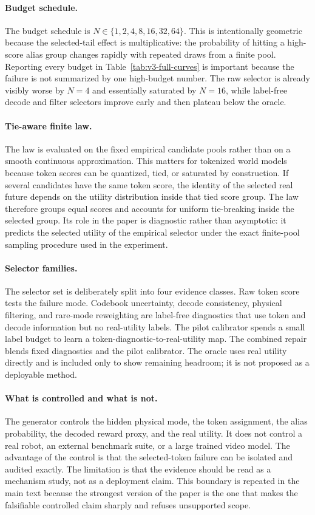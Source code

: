 \paragraph{Budget schedule.}
The budget schedule is $N\in\{1,2,4,8,16,32,64\}$. This is intentionally geometric because the selected-tail effect is multiplicative: the probability of hitting a high-score alias group changes rapidly with repeated draws from a finite pool. Reporting every budget in Table~\ref{tab:v3-full-curves} is important because the failure is not summarized by one high-budget number. The raw selector is already visibly worse by $N=4$ and essentially saturated by $N=16$, while label-free decode and filter selectors improve early and then plateau below the oracle.

\paragraph{Tie-aware finite law.}
The law is evaluated on the fixed empirical candidate pools rather than on a smooth continuous approximation. This matters for tokenized world models because token scores can be quantized, tied, or saturated by construction. If several candidates have the same token score, the identity of the selected real future depends on the utility distribution inside that tied score group. The law therefore groups equal scores and accounts for uniform tie-breaking inside the selected group. Its role in the paper is diagnostic rather than asymptotic: it predicts the selected utility of the empirical selector under the exact finite-pool sampling procedure used in the experiment.

\paragraph{Selector families.}
The selector set is deliberately split into four evidence classes. Raw token score tests the failure mode. Codebook uncertainty, decode consistency, physical filtering, and rare-mode reweighting are label-free diagnostics that use token and decode information but no real-utility labels. The pilot calibrator spends a small label budget to learn a token-diagnostic-to-real-utility map. The combined repair blends fixed diagnostics and the pilot calibrator. The oracle uses real utility directly and is included only to show remaining headroom; it is not proposed as a deployable method.

\paragraph{What is controlled and what is not.}
The generator controls the hidden physical mode, the token assignment, the alias probability, the decoded reward proxy, and the real utility. It does not control a real robot, an external benchmark suite, or a large trained video model. The advantage of the control is that the selected-token failure can be isolated and audited exactly. The limitation is that the evidence should be read as a mechanism study, not as a deployment claim. This boundary is repeated in the main text because the strongest version of the paper is the one that makes the falsifiable controlled claim sharply and refuses unsupported scope.

